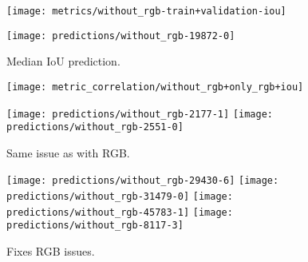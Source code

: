 \begin{figure}[H]
  \centering
  \texttt{[image: metrics/without\_rgb-train+validation-iou]}
\end{figure}

\begin{figure}[H]
  \centering
  \texttt{[image: predictions/without\_rgb-19872-0]}  %
  \caption{%
    Median IoU prediction.
  }
\end{figure}

\begin{figure}[H]
  \centering
  \texttt{[image: metric\_correlation/without\_rgb+only\_rgb+iou]}
\end{figure}

\begin{figure}[H]
  \centering
  \texttt{[image: predictions/without\_rgb-2177-1]}  %
  \texttt{[image: predictions/without\_rgb-2551-0]}  %
  \caption{%
    Same issue as with RGB.
  }
\end{figure}

\begin{figure}[H]
  \centering
  \texttt{[image: predictions/without\_rgb-29430-6]}  %
  \texttt{[image: predictions/without\_rgb-31479-0]}  %
  \texttt{[image: predictions/without\_rgb-45783-1]}  %
  \texttt{[image: predictions/without\_rgb-8117-3]}  %
  \caption{%
    Fixes RGB issues.
  }%
  \label{fig:lidar-corrected-rgb}
\end{figure}
